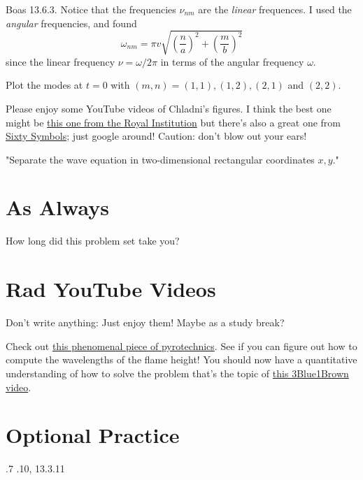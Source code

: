 \documentclass[answers]{exam}\newcommand{\repositoryInformationSetup}{     \usepackage[dvipsnames]{xcolor}     \usepackage[ angle=90, color=black, opacity=1, scale=2, ]{background}      \SetBgPosition{current page.west}      \SetBgVshift{-4.5mm}      \backgroundsetup{contents={{\color{green}\texttt{-{}-} differs from commit \texttt{f3526e2} in 0 files}}} } \newcommand{\commit}{{{\color{green}f3526e2}}}\usepackage{amsmath}
\begin{document}
\begin{questions}
\begin{solution}
		

	\end{solution}

	\question Boas 13.6.3.  Notice that the frequencies $\nu_{nm}$ are the \emph{linear} frequences.  I used the \emph{angular} frequencies, and found
	\begin{equation}
		\omega_{nm} = \pi v \sqrt{\left(\frac{n}{a}\right)^2 + \left(\frac{m}{b}\right)^2}
	\end{equation}
	since the linear frequency $\nu = \omega/2\pi$ in terms of the angular frequency $\omega$.

	Plot the modes at $t=0$ with $(m,n)=(1,1), (1,2), (2,1)$ and $(2,2)$.

	Please enjoy some YouTube videos of Chladni's figures.  I think the best one might be \href{https://www.youtube.com/watch?v=OLNFrxgMJ6E}{this one from the Royal Institution} but there's also a great one from \href{https://www.youtube.com/watch?v=dTReFclu_PU}{Sixty Symbols}; just google around!  Caution: don't blow out your ears!

	\begin{solution}
		"Separate the wave equation in two-dimensional rectangular coordinates $x, y$."

	\end{solution}


	\clearpage
	\section*{As Always}
	\question How long did this problem set take you?

	\section*{Rad YouTube Videos}
	Don't write anything: Just enjoy them!  Maybe as a study break?

	\question Check out \href{https://www.youtube.com/watch?v=dihQuwrf9yQ}{this phenomenal piece of pyrotechnics}. See if you can figure out how to compute the wavelengths of the flame height!
	\question You should now have a quantitative understanding of how to solve the problem that's the topic of \href{https://www.youtube.com/watch?v=ToIXSwZ1pJU}{this 3Blue1Brown video}.

	\section*{Optional Practice}

	.7
	.10, 13.3.11

\end{questions}
\end{document}
